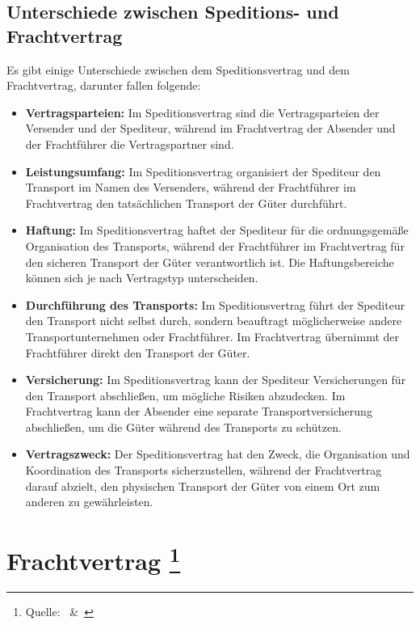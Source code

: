 \section{Unterschiede zwischen Speditions- und Frachtvertrag}
Es gibt einige Unterschiede zwischen dem Speditionsvertrag und dem Frachtvertrag, darunter fallen folgende:\nl

\begin{itemize}
    \item \textbf{Vertragsparteien:} Im Speditionsvertrag sind die Vertragsparteien der Versender und der Spediteur, während im Frachtvertrag der Absender und der Frachtführer die Vertragspartner sind.
    \item \textbf{Leistungsumfang:} Im Speditionsvertrag organisiert der Spediteur den Transport im Namen des Versenders, während der Frachtführer im Frachtvertrag den tatsächlichen Transport der Güter durchführt.
    \item \textbf{Haftung:} Im Speditionsvertrag haftet der Spediteur für die ordnungsgemäße Organisation des Transports, während der Frachtführer im Frachtvertrag für den sicheren Transport der Güter verantwortlich ist. Die Haftungsbereiche können sich je nach Vertragstyp unterscheiden.
    \item \textbf{Durchführung des Transports:} Im Speditionsvertrag führt der Spediteur den Transport nicht selbst durch, sondern beauftragt möglicherweise andere Transportunternehmen oder Frachtführer. Im Frachtvertrag übernimmt der Frachtführer direkt den Transport der Güter.
    \item \textbf{Versicherung:} Im Speditionsvertrag kann der Spediteur Versicherungen für den Transport abschließen, um mögliche Risiken abzudecken. Im Frachtvertrag kann der Absender eine separate Transportversicherung abschließen, um die Güter während des Transports zu schützen.
    \item \textbf{Vertragszweck:} Der Speditionsvertrag hat den Zweck, die Organisation und Koordination des Transports sicherzustellen, während der Frachtvertrag darauf abzielt, den physischen Transport der Güter von einem Ort zum anderen zu gewährleisten.
\end{itemize}



\chapter[Frachtvertrag]{Frachtvertrag \footnote{Quelle:~\cite{Handelsrecht} \&~\cite{frachtvertrag}}}

